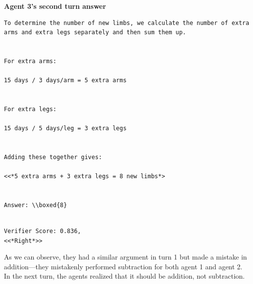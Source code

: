 \textbf{Agent 3's second turn answer} 
\begin{lstlisting}[breaklines=true]
To determine the number of new limbs, we calculate the number of extra arms and extra legs separately and then sum them up.


For extra arms:

15 days / 3 days/arm = 5 extra arms


For extra legs:

15 days / 5 days/leg = 3 extra legs


Adding these together gives:

<<*5 extra arms + 3 extra legs = 8 new limbs*>


Answer: \\boxed{8}


\end{lstlisting}
\begin{lstlisting}
Verifier Score: 0.836,
<<*Right*>> 
\end{lstlisting}


As we can observe, they had a similar argument in turn 1 but made a mistake in addition—they mistakenly performed subtraction for both agent 1 and agent 2. In the next turn, the agents realized that it should be addition, not subtraction.

